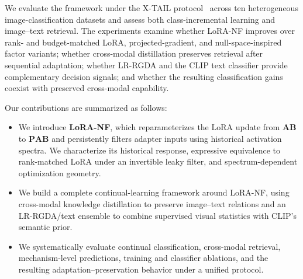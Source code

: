 We evaluate the framework under the X-TAIL protocol~\cite{xu2024rail} across ten heterogeneous image-classification datasets and assess both class-incremental learning and image--text retrieval. The experiments examine whether LoRA-NF improves over rank- and budget-matched LoRA, projected-gradient, and null-space-inspired factor variants; whether cross-modal distillation preserves retrieval after sequential adaptation; whether LR-RGDA and the CLIP text classifier provide complementary decision signals; and whether the resulting classification gains coexist with preserved cross-modal capability. 

Our contributions are summarized as follows:
\begin{itemize}[leftmargin=*]
    \item We introduce \textbf{LoRA-NF}, which reparameterizes the LoRA update from $\mathbf{A}\mathbf{B}$ to $\mathbf{P}\mathbf{A}\mathbf{B}$ and persistently filters adapter inputs using historical activation spectra. We characterize its historical response, expressive equivalence to rank-matched LoRA under an invertible leaky filter, and spectrum-dependent optimization geometry.
    \item We build a complete continual-learning framework around LoRA-NF, using cross-modal knowledge distillation to preserve image--text relations and an LR-RGDA/text ensemble to combine supervised visual statistics with CLIP's semantic prior.
    \item We systematically evaluate continual classification, cross-modal retrieval, mechanism-level predictions, training and classifier ablations, and the resulting adaptation--preservation behavior under a unified protocol.
\end{itemize}
